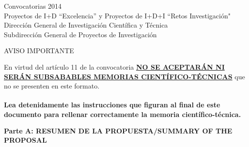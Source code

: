 \documentclass[a4paper,11pt,oneside]{article}
\begin{document}


\begin{tcolorbox}[colback=white,arc=0pt,outer arc=0pt,colframe=black,boxrule=0.6pt]
\begin{center}
Convocatorias 2014\\ 
Proyectos de I+D ``Excelencia'' y Proyectos de I+D+I ``Retos Investigación" \\ 
Dirección General de Investigación Científica y Técnica \\
Subdirección General de Proyectos de Investigación
\end{center} 
\end{tcolorbox}

\begin{tcolorbox}[colback=yellow,arc=0pt,outer arc=0pt,colframe=black,boxrule=0.6pt,left=0mm,right=0mm]
  \begin{center}
    AVISO IMPORTANTE\\
  \end{center}
    En virtud del art\'iculo 11 de la convocatoria \ul{\textbf{NO SE ACEPTAR\'AN NI SER\'AN SUBSABABLES MEMORIAS CIENT\'IFICO-T\'ECNICAS}} que no se presenten en este formato.\\
    \\
    \textbf{Lea detenidamente las instrucciones que figuran al final de este documento para rellenar correctamente la memoria cient\'ifico-t\'ecnica.}
    \\
\end{tcolorbox}
\vspace{3pt}
\begin{tcolorbox}[colback=yellow,arc=0pt,outer arc=0pt,colframe=black,boxrule=0.6pt,left=0mm]
  \noindent\textbf{Parte A: RESUMEN DE LA PROPUESTA/SUMMARY OF THE PROPOSAL}
\end{tcolorbox}


\end{document}
